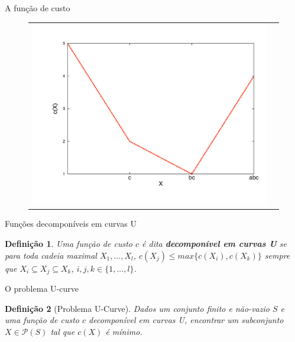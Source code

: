 \documentclass{beamer}
\newtheorem{mydefinition}{Definição}
\newcommand{\powerset}{\mathcal{P}}
\begin{document}
\begin{frame}{A função de custo}
\begin{figure}[ht]
\begin{tabular}{c c}
{{        \includegraphics[clip=true, trim={1cm 0cm 1cm 2cm}]{intro/example_lattice_chain_3.pdf}}
    \label{fig:intro:chain} }
    \end{tabular}
\end{figure}
\end{frame}

\begin{frame}{Funções decomponíveis em curvas U}
\begin{mydefinition}\label{fund_concepts:ushape}
Uma função de custo $c$ é dita {\bf \em decomponível em curvas U} se
para toda cadeia maximal $X_1, ..., X_l$, $c(X_j) \leq max \{c (X_i),
c (X_k)\}$ sempre que $X_i \subseteq X_j \subseteq X_k$, $i, j, k \in 
\{1, ..., l\}$.
\end{mydefinition}
\end{frame}


\begin{frame}{O problema U-curve}
\begin{mydefinition}[Problema U-Curve]
Dados um conjunto finito e não-vazio $S$ e uma função de custo $c$ 
decomponível em curvas U, encontrar um subconjunto $X \in \powerset (S)$ 
tal que $c(X)$ é mínimo.
\end{mydefinition}
\end{frame}
\end{document}
